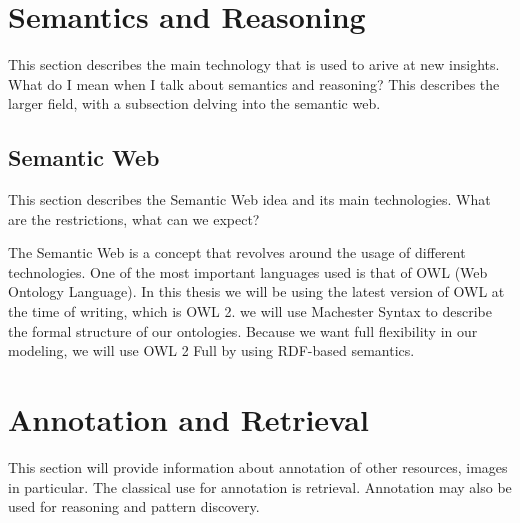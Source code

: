 
\section{Semantics and Reasoning}

This section describes the main technology that is used to arive at new insights. What do I mean when I talk about semantics and reasoning? This describes the larger field, with a subsection delving into the semantic web.


\subsection{Semantic Web}

This section describes the Semantic Web idea and its main technologies. What are the restrictions, what can we expect?

The Semantic Web is a concept that revolves around the usage of
different technologies. One of the most important languages used is
that of OWL (Web Ontology Language). In this thesis we will be using
the latest version of OWL at the time of writing, which is OWL 2. we
will use Machester Syntax to describe the formal structure of our
ontologies. Because we want full flexibility in our modeling, we will
use OWL 2 Full by using RDF-based semantics.




\section{Annotation and Retrieval}

This section will provide information about annotation of other resources, images in particular. The classical use for annotation is retrieval. Annotation may also be used for reasoning and pattern discovery.


